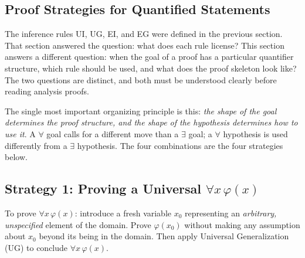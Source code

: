 
\subsection{Proof Strategies for Quantified Statements}


\begin{exposition}
The inference rules UI, UG, EI, and EG were defined in the previous section.
That section answered the question: what does each rule license? This section
answers a different question: when the goal of a proof has a particular
quantifier structure, which rule should be used, and what does the proof
skeleton look like? The two questions are distinct, and both must be understood
clearly before reading analysis proofs.
\end{exposition}

\begin{exposition}
The single most important organizing principle is this: \emph{the shape of the
goal determines the proof structure, and the shape of the hypothesis determines
how to use it}. A $\forall$ goal calls for a different move than a $\exists$
goal; a $\forall$ hypothesis is used differently from a $\exists$ hypothesis.
The four combinations are the four strategies below.
\end{exposition}


\subsection*{\texorpdfstring{Strategy 1: Proving a Universal $\forall x\,\varphi(x)$}{Strategy 1: Proving a Universal forall x phi(x)}}

\begin{exposition}
To prove $\forall x\,\varphi(x)$: introduce a fresh variable $x_0$ representing
an \emph{arbitrary, unspecified} element of the domain. Prove $\varphi(x_0)$
without making any assumption about $x_0$ beyond its being in the domain. Then
apply Universal Generalization (UG) to conclude $\forall x\,\varphi(x)$.
\end{exposition}

